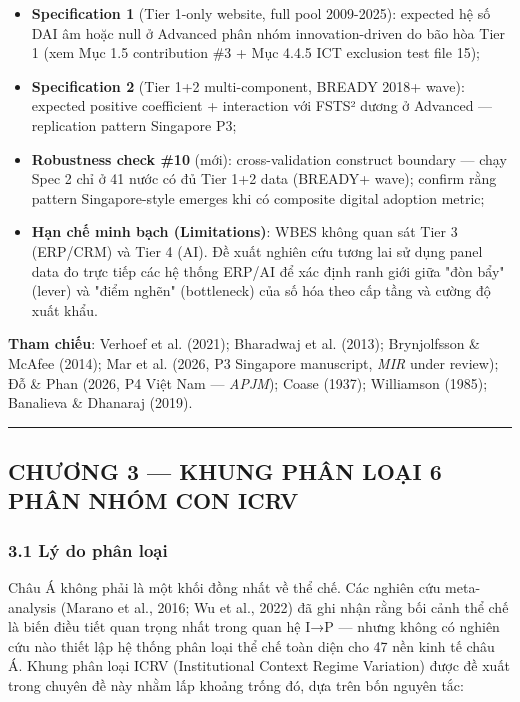 \documentclass[12pt,a4paper]{article}
\providecommand{\tightlist}{\setlength{\itemsep}{0pt}\setlength{\parskip}{0pt}}
\begin{document}
\begin{itemize}
\tightlist
\item
  \textbf{Specification 1} (Tier 1-only website, full pool 2009-2025):
  expected hệ số DAI âm hoặc null ở Advanced phân nhóm innovation-driven
  do bão hòa Tier 1 (xem Mục 1.5 contribution \#3 + Mục 4.4.5 ICT
  exclusion test file 15);
\item
  \textbf{Specification 2} (Tier 1+2 multi-component, BREADY 2018+
  wave): expected positive coefficient + interaction với FSTS² dương ở
  Advanced --- replication pattern Singapore P3;
\item
  \textbf{Robustness check \#10} (mới): cross-validation construct
  boundary --- chạy Spec 2 chỉ ở 41 nước có đủ Tier 1+2 data (BREADY+
  wave); confirm rằng pattern Singapore-style emerges khi có composite
  digital adoption metric;
\item
  \textbf{Hạn chế minh bạch (Limitations)}: WBES không quan sát Tier 3
  (ERP/CRM) và Tier 4 (AI). Đề xuất nghiên cứu tương lai sử dụng panel
  data đo trực tiếp các hệ thống ERP/AI để xác định ranh giới giữa "đòn
  bẩy" (lever) và "điểm nghẽn" (bottleneck) của số hóa theo cấp tầng và
  cường độ xuất khẩu.
\end{itemize}

\textbf{Tham chiếu}: Verhoef et al. (2021); Bharadwaj et al. (2013);
Brynjolfsson \& McAfee (2014); Mar et al. (2026, P3 Singapore
manuscript, \emph{MIR} under review); Đỗ \& Phan (2026, P4 Việt Nam ---
\emph{APJM}); Coase (1937); Williamson (1985); Banalieva \& Dhanaraj
(2019).

\begin{center}\rule{0.5\linewidth}{0.5pt}\end{center}

\hypertarget{chux1b0ux1a1ng-3--khung-phuxe2n-loux1ea1i-6-phuxe2n-nhuxf3m-con-icrv}{%
\subsection{CHƯƠNG 3 --- KHUNG PHÂN LOẠI 6 PHÂN NHÓM CON
ICRV}\label{chux1b0ux1a1ng-3--khung-phuxe2n-loux1ea1i-6-phuxe2n-nhuxf3m-con-icrv}}

\hypertarget{31-luxfd-do-phuxe2n-loux1ea1i}{%
\subsubsection{3.1 Lý do phân
loại}\label{31-luxfd-do-phuxe2n-loux1ea1i}}

Châu Á không phải là một khối đồng nhất về thể chế. Các nghiên cứu
meta-analysis (Marano et al., 2016; Wu et al., 2022) đã ghi nhận rằng
bối cảnh thể chế là biến điều tiết quan trọng nhất trong quan hệ I→P ---
nhưng không có nghiên cứu nào thiết lập hệ thống phân loại thể chế toàn
diện cho 47 nền kinh tế châu Á. Khung phân loại ICRV (Institutional
Context Regime Variation) được đề xuất trong chuyên đề này nhằm lấp
khoảng trống đó, dựa trên bốn nguyên tắc:
\end{document}
